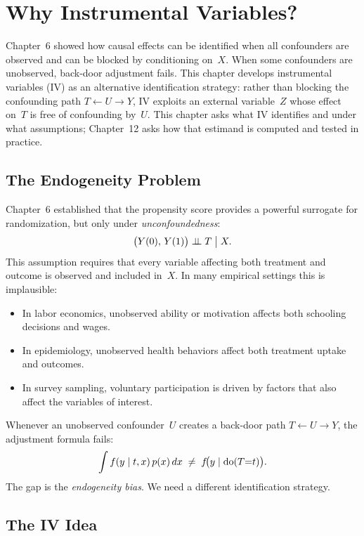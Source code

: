 \documentclass[master.tex]{subfiles}
\begin{document}
\section{Why Instrumental Variables?}
\label{w7:sec:why}

Chapter~6 showed how causal effects can be identified when all
confounders are observed and can be blocked by conditioning on~$X$.
When some confounders are unobserved, back-door adjustment fails.
This chapter develops instrumental variables (IV) as an alternative
identification strategy: rather than blocking the confounding path
$T \leftarrow U \rightarrow Y$, IV exploits an external variable~$Z$
whose effect on~$T$ is free of confounding by~$U$.  This chapter
asks what IV identifies and under what assumptions; Chapter~12 asks
how that estimand is computed and tested in practice.

\subsection{The Endogeneity Problem}

Chapter~6 established that the propensity score provides a powerful
surrogate for randomization, but only under \emph{unconfoundedness}:
\[
  \bigl(Y(0),\, Y(1)\bigr) \perp\!\!\!\perp T \;\big|\; X.
\]
This assumption requires that every variable affecting both treatment
and outcome is observed and included in~$X$.  In many empirical
settings this is implausible:
\begin{itemize}
  \item In labor economics, unobserved ability or motivation affects
    both schooling decisions and wages.
  \item In epidemiology, unobserved health behaviors affect both
    treatment uptake and outcomes.
  \item In survey sampling, voluntary participation is driven by
    factors that also affect the variables of interest.
\end{itemize}
Whenever an unobserved confounder~$U$ creates a back-door path
$T \leftarrow U \rightarrow Y$, the adjustment formula fails:
\[
  \int f(y \mid t, x)\, p(x)\, dx
  \;\neq\;
  f\!\bigl(y \mid \mathrm{do}(T{=}t)\bigr).
\]
The gap is the \emph{endogeneity bias}.  We need a different
identification strategy.

\subsection{The IV Idea}
\end{document}
